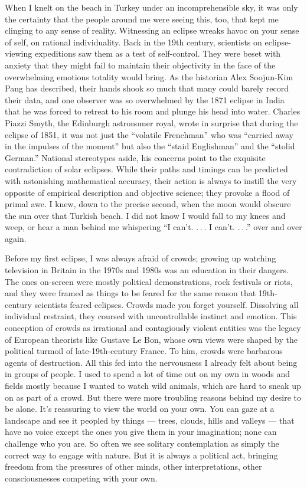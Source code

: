 When I knelt on the beach in Turkey under an incomprehensible sky, it
was only the certainty that the people around me were seeing this, too,
that kept me clinging to any sense of reality. Witnessing an eclipse
wreaks havoc on your sense of self, on rational individuality. Back in
the 19th century, scientists on eclipse-viewing expeditions saw them as
a test of self-control. They were beset with anxiety that they might
fail to maintain their objectivity in the face of the overwhelming
emotions totality would bring. As the historian Alex Soojun-Kim Pang has
described, their hands shook so much that many could barely record their
data, and one observer was so overwhelmed by the 1871 eclipse in India
that he was forced to retreat to his room and plunge his head into
water. Charles Piazzi Smyth, the Edinburgh astronomer royal, wrote in
surprise that during the eclipse of 1851, it was not just the ``volatile
Frenchman'' who was ``carried away in the impulses of the moment'' but
also the ``staid Englishman'' and the ``stolid German.'' National
stereotypes aside, his concerns point to the exquisite contradiction of
solar eclipses. While their paths and timings can be predicted with
astonishing mathematical accuracy, their action is always to instill the
very opposite of empirical description and objective science; they
provoke a flood of primal awe. I knew, down to the precise second, when
the moon would obscure the sun over that Turkish beach. I did not know I
would fall to my knees and weep, or hear a man behind me whispering ``I
can't. . . . I can't. . . .'' over and over again.

Before my first eclipse, I was always afraid of crowds; growing up
watching television in Britain in the 1970s and 1980s was an education
in their dangers. The ones on-screen were mostly political
demonstrations, rock festivals or riots, and they were framed as things
to be feared for the same reason that 19th-century scientists feared
eclipses. Crowds made you forget yourself. Dissolving all individual
restraint, they coursed with uncontrollable instinct and emotion. This
conception of crowds as irrational and contagiously violent entities was
the legacy of European theorists like Gustave Le Bon, whose own views
were shaped by the political turmoil of late-19th-century France. To
him, crowds were barbarous agents of destruction. All this fed into the
nervousness I already felt about being in groups of people. I used to
spend a lot of time out on my own in woods and fields mostly because I
wanted to watch wild animals, which are hard to sneak up on as part of a
crowd. But there were more troubling reasons behind my desire to be
alone. It's reassuring to view the world on your own. You can gaze at a
landscape and see it peopled by things --- trees, clouds, hills and
valleys --- that have no voice except the ones you give them in your
imagination; none can challenge who you are. So often we see solitary
contemplation as simply the correct way to engage with nature. But it is
always a political act, bringing freedom from the pressures of other
minds, other interpretations, other consciousnesses competing with your
own.

